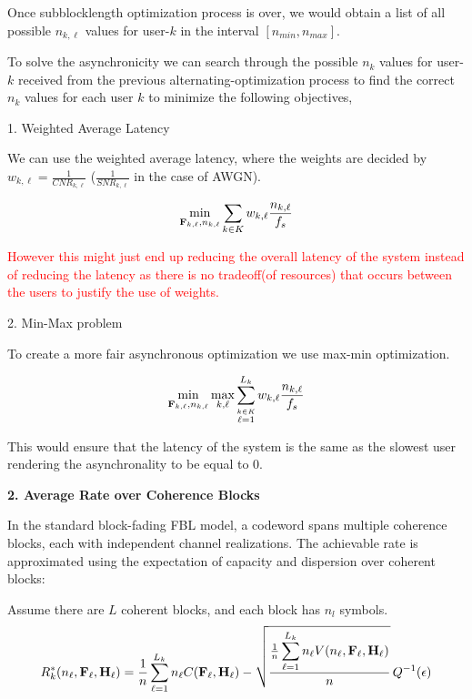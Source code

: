 \documentclass[a4paper, 12pt, onecolumn, journal, twoside, draftclsnofoot]{IEEEtran}
\begin{document}
Once subblocklength optimization process is over, we would obtain a list of all possible $n_{k,\ell}$ values for user-$k$ in the interval $[n_{min}, n_{max}]$.

To solve the asynchronicity  we can search through the possible $n_k$ values  for user-$k$  received from the previous alternating-optimization process to find the correct $n_k$ values for each user $k$ to minimize the following objectives,


1. Weighted Average Latency 

We can use the weighted average latency, where the weights are decided by $w_{k,\ell} = \frac{1}{CNR_{k,\ell}}$ ($\frac{1}{SNR_{k,\ell}}$ in the case of AWGN).

\begin{equation*}
	\min_{{\bf F}_{k,\ell}, n_{k,\ell}} \sum_{k \in K} w_{k,\ell} \frac{n_{k,\ell}}{f_s}
\end{equation*}

\textcolor{red}{However this might just end up reducing the overall latency of the system instead of reducing the latency as there is no tradeoff(of resources) that occurs between the users to justify the use of weights.}


2. Min-Max problem


To create a more fair asynchronous optimization we use max-min optimization.

\begin{equation*}
	\min_{ {\bf F}_{k,\ell}, n_{k,\ell}} \max_{k,\ell} \sum_{\stackrel {k \in K} {\ell =1}}^{L_k} w_{k,\ell} \frac{n_{k,\ell}}{f_s}
\end{equation*}

This would ensure that the latency of the system is the same as the slowest user rendering the asynchronality to be equal to $0$.

\textbf{2. Average Rate over Coherence Blocks}

In the standard block-fading FBL model, a codeword spans multiple coherence blocks, each with independent channel realizations. The achievable rate is approximated using the expectation of capacity and dispersion over coherent blocks:

Assume there are $L$ coherent blocks, and each block has $n_l$ symbols.
\begin{equation*}
		R^*_k(n_\ell, {\bf F}_\ell, {\bf H}_\ell) = \frac{1}{n} \sum_{\ell=1}^{L_k} n_\ell C({\bf F}_\ell, {\bf H}_\ell) - 
	\sqrt{\frac{\frac{1}{n} \displaystyle \sum_{\ell=1}^{L_k} n_\ell V(n_\ell, {\bf F}_\ell, {\bf H}_\ell)}{n}} \, Q^{-1}(\epsilon)
\end{equation*}
\end{document}
